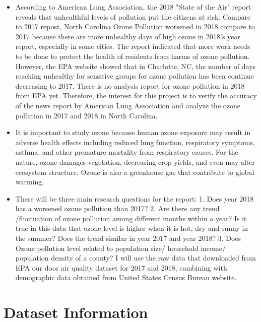 \documentclass[12pt,]{article}
\begin{document}
\begin{itemize}
\item[]      According to American Lung Association, the 2018 "State of the Air" report reveals that unhealthful levels of pollution put the citizens at risk.  Compare to 2017 repost, North Carolina Ozone Pollution worsened in 2018 compare to 2017 because there are more unhealthy days of high ozone in 2018's year report, especially in some cities. The report indicated that more work needs to be done to protect the health of residents from harms of ozone pollution. However, the EPA website showed that in Charlotte, NC, the number of days reaching unhealthy for sensitive groups for ozone pollution has been continue decreasing to 2017. There is no analysis report for ozone pollution in 2018 from EPA yet. Therefore, the interest for this project is to verify the accuracy of the news report by American Lung Association and analyze the ozone pollution in 2017 and 2018 in North Carolina.  
\item[]     It is important to study ozone because human ozone exposure may result in adverse health effects including reduced lung function, respiratory symptoms, asthma, and other premature mortality from respiratory causes. For the nature, ozone damages vegetation, decreasing crop yields, and even may alter ecosystem structure. Ozone is also a greenhouse gas that contribute to global warming.  
\item[]      There will be three main research questions for the report: 1. Does year 2018 has a worsened ozone pollution than 2017? 2. Are there any trend /fluctuation of ozone pollution among different months within a year? Is it true in this data that ozone level is higher when it is hot, dry and sunny in the summer? Does the trend similar in year 2017 and year 2018? 3. Does Ozone pollution level related to population size/ household income/ population density of a county? I will use the raw data that downloaded from EPA our door air quality dataset for 2017 and 2018, combining with demographic data obtained from United States Census Bureau website.
\end{itemize}

\newpage

\section{Dataset Information}\label{dataset-information}
\end{document}
